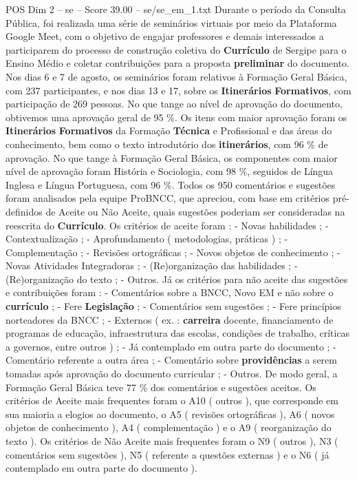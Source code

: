 \begin{textsample}{POS Dim 2 – se – Score 39.00 – se/se\_em\_1.txt}
Durante o período da Consulta Pública, foi realizada uma série de seminários virtuais por meio da Plataforma Google Meet, com o objetivo de engajar professores e demais interessados a participarem do processo de construção coletiva do \textbf{Currículo} de Sergipe para o Ensino Médio e coletar contribuições para a proposta \textbf{preliminar} do documento.
Nos dias 6 e 7 de agosto, os seminários foram relativos à Formação Geral Básica, com 237 participantes, e nos dias 13 e 17, sobre os \textbf{Itinerários} \textbf{Formativos}, com participação de 269 pessoas.
No que tange ao nível de aprovação do documento, obtivemos uma aprovação geral de 95 \%.
Os itens com maior aprovação foram os \textbf{Itinerários} \textbf{Formativos} da Formação \textbf{Técnica} e Profissional e das áreas do conhecimento, bem como o texto introdutório dos \textbf{itinerários}, com 96 \% de aprovação.
No que tange à Formação Geral Básica, os componentes com maior nível de aprovação foram História e Sociologia, com 98 \%, seguidos de Língua Inglesa e Língua Portuguesa, com 96 \%.
Todos os 950 comentários e sugestões foram analisados pela equipe ProBNCC, que apreciou, com base em critérios pré-definidos de Aceite ou Não Aceite, quais sugestões poderiam ser consideradas na reescrita do \textbf{Currículo}.
Os critérios de aceite foram : - Novas habilidades ; - Contextualização ; - Aprofundamento ( metodologias, práticas ) ; - Complementação ; - Revisões ortográficas ; - Novos objetos de conhecimento ; - Novas Atividades Integradoras ; - (Re)organização das habilidades ; - (Re)organização do texto ; - Outros.
Já os critérios para não aceite das sugestões e contribuições foram : - Comentários sobre a BNCC, Novo EM e não sobre o \textbf{currículo} ; - Fere \textbf{Legislação} ; - Comentários sem sugestões ; - Fere princípios norteadores da BNCC ; - Externos ( ex. : \textbf{carreira} docente, financiamento de programas de educação, infraestrutura das escolas, condições de trabalho, críticas a governos, entre outros ) ; - Já contemplado em outra parte do documento ; - Comentário referente a outra área ; - Comentário sobre \textbf{providências} a serem tomadas após aprovação do documento curricular ; - Outros.
De modo geral, a Formação Geral Básica teve 77 \% dos comentários e sugestões aceitos.
Os critérios de Aceite mais frequentes foram o A10 ( outros ), que corresponde em sua maioria a elogios ao documento, o A5 ( revisões ortográficas ), A6 ( novos objetos de conhecimento ), A4 ( complementação ) e o A9 ( reorganização do texto ).
Os critérios de Não Aceite mais frequentes foram o N9 ( outros ), N3 ( comentários sem sugestões ), N5 ( referente a questões externas ) e o N6 ( já contemplado em outra parte do documento ).

\end{textsample}

